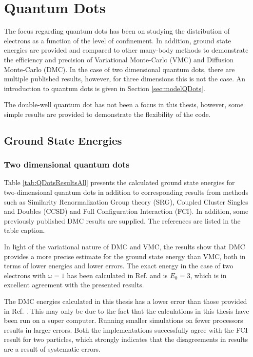 \section{Quantum Dots}

The focus regarding quantum dots has been on studying the distribution of electrons as a function of the level of confinement. In addition, ground state energies are provided and compared to other many-body methods to demonstrate the efficiency and precision of Variational Monte-Carlo (VMC) and Diffusion Monte-Carlo (DMC). In the case of two dimensional quantum dots, there are multiple published results, however, for three dimensions this is not the case. An introduction to quantum dots is given in Section \ref{sec:modelQDots}. 

The double-well quantum dot has not been a focus in this thesis, however, some simple results are provided to demonstrate the flexibility of the code.

\subsection{Ground State Energies}

\subsubsection{Two dimensional quantum dots}

Table \ref{tab:QDotsResultsAll} presents the calculated ground state energies for two-dimensional quantum dots in addition to corresponding results from methods such as Similarity Renormalization Group theory (SRG), Coupled Cluster Singles and Doubles (CCSD) and Full Configuration Interaction (FCI). In addition, some previously published DMC results are supplied. The references are listed in the table caption.

In light of the variational nature of DMC and VMC, the results show that DMC provides a more precise estimate for the ground state energy than VMC, both in terms of lower energies and lower errors. The exact energy in the case of two electrons with $\omega=1$ has been calculated in Ref. \cite{taut} and is $E_0 = 3$, which is in excellent agreement with the presented results.

The DMC energies calculated in this thesis has a lower error than those provided in Ref. \cite{MagnusArticle}. This may only be due to the fact that the calculations in this thesis have been run on a super computer. Running smaller simulations on fewer processors results in larger errors. Both the implementations successfully agree with the FCI result for two particles, which strongly indicates that the disagreements in results are a result of systematic errors.    

